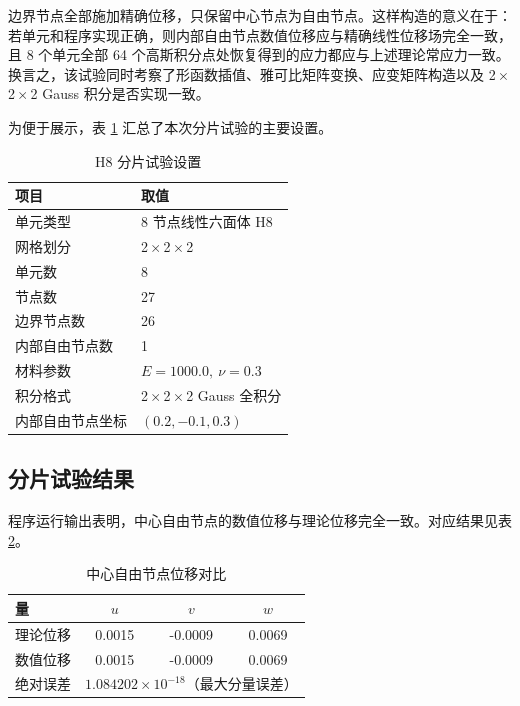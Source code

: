 \documentclass[12pt,a4paper]{article}
\begin{document}
边界节点全部施加精确位移，只保留中心节点为自由节点。这样构造的意义在于：若单元和程序实现正确，则内部自由节点数值位移应与精确线性位移场完全一致，且 8 个单元全部 64 个高斯积分点处恢复得到的应力都应与上述理论常应力一致。换言之，该试验同时考察了形函数插值、雅可比矩阵变换、应变矩阵构造以及 2\,$\times$\,2\,$\times$\,2 Gauss 积分是否实现一致。

为便于展示，表 \ref{tab:patch_setup} 汇总了本次分片试验的主要设置。

\begin{table}[htbp]
\centering
\caption{H8 分片试验设置}
\label{tab:patch_setup}
\begin{tabular}{ll}
\toprule
项目 & 取值 \\
\midrule
单元类型 & 8 节点线性六面体 H8 \\
网格划分 & 2\,$\times$\,2\,$\times$\,2 \\
单元数 & 8 \\
节点数 & 27 \\
边界节点数 & 26 \\
内部自由节点数 & 1 \\
材料参数 & $E=1000.0,\ \nu=0.3$ \\
积分格式 & 2\,$\times$\,2\,$\times$\,2 Gauss 全积分 \\
内部自由节点坐标 & $(0.2,-0.1,0.3)$ \\
\bottomrule
\end{tabular}
\end{table}

\subsection{分片试验结果}

程序运行输出表明，中心自由节点的数值位移与理论位移完全一致。对应结果见表 \ref{tab:patch_center_disp}。

\begin{table}[htbp]
\centering
\caption{中心自由节点位移对比}
\label{tab:patch_center_disp}
\begin{tabular}{lccc}
\toprule
量 & $u$ & $v$ & $w$ \\
\midrule
理论位移 & 0.0015 & -0.0009 & 0.0069 \\
数值位移 & 0.0015 & -0.0009 & 0.0069 \\
绝对误差 & \multicolumn{3}{c}{$1.084202\times10^{-18}$（最大分量误差）} \\
\bottomrule
\end{tabular}
\end{table}
\end{document}
